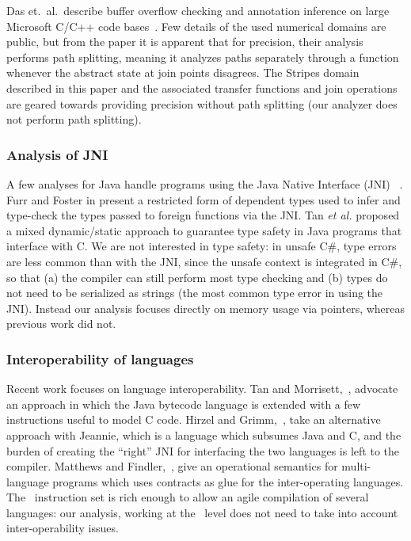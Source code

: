 \documentclass[10pt]{sigplanconf}
\begin{document}
Das et.~al.~describe buffer overflow checking and annotation inference
on large Microsoft C/C++ code bases~\cite{DasEtAl06}. Few details of
the used numerical domains are public, but from the paper it is
apparent that for precision, their analysis performs path splitting,
meaning it analyzes paths separately through a function whenever the
abstract state at join points disagrees. The Stripes domain described
in this paper and the associated transfer functions and join operations are
geared towards providing precision without path splitting (our
analyzer does not perform path splitting).

\subsubsection*{Analysis of JNI} 
A few analyses for Java handle programs using the Java Native
Interface (JNI) ~\cite{jni}.  Furr and Foster in \cite{FurrFoster06}
present a restricted form of dependent types used to infer and
type-check the types passed to foreign functions via the JNI.  Tan
\emph{et al.} proposed a mixed dynamic/static approach to guarantee
type safety in Java programs that interface with C.  We are not
interested in type safety: in unsafe C\#, type errors are less common
than with the JNI, since the unsafe context is integrated in C\#, so that
(a) the compiler can still perform most type checking and (b) types
do not need to be serialized as strings (the most common type error in
using the JNI). Instead our analysis focuses directly on memory usage
via pointers, whereas previous work did not.

\subsubsection*{Interoperability of languages}
Recent work focuses on language interoperability.  Tan and
Morrisett,~\cite{TanMorrisett07}, advocate an approach in which the
Java bytecode language is extended with a few instructions useful to
model C code.  Hirzel and Grimm,~\cite{HirzelGrimm07}, take an
alternative approach with Jeannie, which is a language which subsumes
Java and C, and the burden of creating the ``right'' JNI for
interfacing the two languages is left to the compiler.  Matthews
and Findler,~\cite{MatthewsFindler07}, give an operational semantics
for multi-language programs which uses contracts as glue for the
inter-operating languages.  The \MSIL\ instruction set is rich enough
to allow an agile compilation of several languages: our analysis,
working at the \MSIL\ level does not need to take into account
inter-operability issues.
\end{document}
